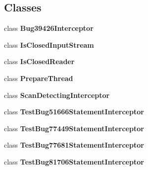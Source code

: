 \subsection*{Classes}
\begin{DoxyCompactItemize}
\item 
class {\bfseries Bug39426\+Interceptor}
\item 
class {\bfseries Is\+Closed\+Input\+Stream}
\item 
class {\bfseries Is\+Closed\+Reader}
\item 
class {\bfseries Prepare\+Thread}
\item 
class {\bfseries Scan\+Detecting\+Interceptor}
\item 
class {\bfseries Test\+Bug51666\+Statement\+Interceptor}
\item 
class {\bfseries Test\+Bug77449\+Statement\+Interceptor}
\item 
class {\bfseries Test\+Bug77681\+Statement\+Interceptor}
\item 
class {\bfseries Test\+Bug81706\+Statement\+Interceptor}
\end{DoxyCompactItemize}
